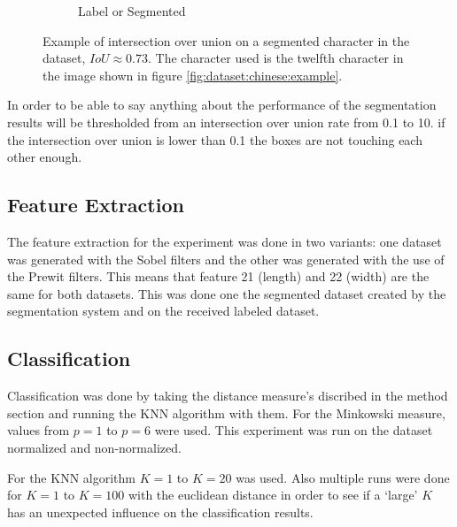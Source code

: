 \begin{figure}[ht]
\begin{subfigure}{0.24\textwidth}
    \caption{Label or Segmented}
    \label{fig:experiment:or}
  \end{subfigure}
  \caption{Example of intersection over union on a segmented character in the dataset, $IoU \approx 0.73$. The character used is the twelfth character in the image shown in figure \ref{fig:dataset:chinese:example}. }
  \label{fig:experiment:iou:example}
\end{figure}

In order to be able to say anything about the performance of the segmentation results will be thresholded from an intersection over union rate from 0.1 to 10. if the intersection over union is lower than 0.1 the boxes are not touching each other enough.


\subsection{Feature Extraction}

The feature extraction for the experiment was done in two variants: one dataset was generated with the Sobel filters and the other was generated with the use of the Prewit filters. This means that feature 21 (length) and 22 (width) are the same for both datasets. This was done one the segmented dataset created by the segmentation system and on the received labeled dataset.
\subsection{Classification}

Classification was done by taking the distance measure's discribed in the method section  and running the KNN algorithm with them. For the Minkowski measure, values from $p=1$ to $p=6$ were used. This experiment was run on the dataset normalized and non-normalized.

For the KNN algorithm $K=1$ to $K=20$ was used. Also multiple runs were done for $K=1$ to $K=100$ with the euclidean distance in order to see if a `large' $K$ has an unexpected influence on the classification results.






